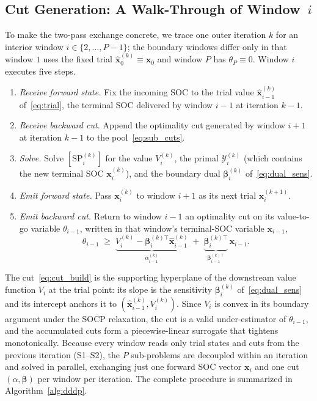 \subsection{Cut Generation: A Walk-Through of Window~$i$}
\label{ssec:cuts}

To make the two-pass exchange concrete, we trace one outer iteration $k$
for an interior window $i\in\{2,\dots,P{-}1\}$; the boundary windows
differ only in that window $1$ uses the fixed trial
$\hat{\bm{x}}_0^{(k)}\equiv\bm{x}_0$ and window $P$ has
$\theta_P\equiv0$. Window $i$ executes five steps.
\begin{enumerate}\itemsep2pt
\item[\textbf{S1.}] \emph{Receive forward state.} Fix the incoming SOC
to the trial value $\hat{\bm{x}}_{i-1}^{(k)}$ of~\eqref{eq:trial}, the
terminal SOC delivered by window $i{-}1$ at iteration $k{-}1$.
\item[\textbf{S2.}] \emph{Receive backward cut.} Append the optimality
cut generated by window $i{+}1$ at iteration $k{-}1$ to the
pool~\eqref{eq:sub_cuts}.
\item[\textbf{S3.}] \emph{Solve.} Solve $[\mathrm{SP}_i^{(k)}]$ for the
value $V_i^{(k)}$, the primal $\mathcal{Y}_i^{(k)}$ (which contains the
new terminal SOC $\bm{x}_i^{(k)}$), and the boundary dual
$\bm{\beta}_i^{(k)}$ of~\eqref{eq:dual_sens}.
\item[\textbf{S4.}] \emph{Emit forward state.} Pass $\bm{x}_i^{(k)}$ to
window $i{+}1$ as its next trial $\hat{\bm{x}}_i^{(k+1)}$.
\item[\textbf{S5.}] \emph{Emit backward cut.} Return to window $i{-}1$ an
optimality cut on its value-to-go variable $\theta_{i-1}$, written in
that window's terminal-SOC variable $\bm{x}_{i-1}$,
\begin{equation}
\label{eq:cut_build}
\theta_{i-1} \;\ge\;
\underbrace{V_i^{(k)} - \bm{\beta}_i^{(k)\top}\hat{\bm{x}}_{i-1}^{(k)}}_{\alpha_{i-1}^{(k)}}
\;+\;
\underbrace{\bm{\beta}_i^{(k)\top}}_{\bm{\beta}_{i-1}^{(k)\top}}\,
\bm{x}_{i-1}.
\end{equation}
\end{enumerate}
The cut~\eqref{eq:cut_build} is the supporting hyperplane of the
downstream value function $V_i$ at the trial point: its slope is the
sensitivity $\bm{\beta}_i^{(k)}$ of~\eqref{eq:dual_sens} and its
intercept anchors it to $(\hat{\bm{x}}_{i-1}^{(k)},V_i^{(k)})$. Since
$V_i$ is convex in its boundary argument under the SOCP relaxation, the
cut is a valid under-estimator of $\theta_{i-1}$, and the accumulated
cuts form a piecewise-linear surrogate that tightens monotonically.
Because every window reads only trial states and cuts from the previous
iteration (S1--S2), the $P$ sub-problems are decoupled within an
iteration and solved in parallel, exchanging just one forward SOC vector
$\bm{x}_i$ and one cut $(\alpha,\bm{\beta})$ per window per iteration. The
complete procedure is summarized in Algorithm~\ref{alg:dddp}.

